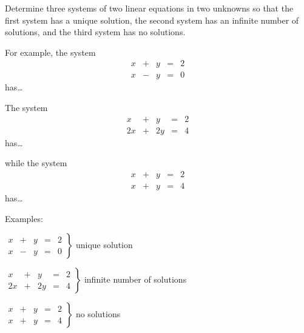 \documentclass{ximera}
\begin{document}
\begin{exercise} \label{c2.2.6}
Determine three systems of two linear equations in two unknowns
so that the first system has a unique solution, the second
system has an infinite number of solutions, and the third system
has no solutions.

\begin{prompt}
  For example, the system
  \[\begin{array}{rrrrr}
x & + & y & = & 2 \\
x & - & y & = & 0\end{array}\]
has\ldots
\begin{multipleChoice}
\end{multipleChoice}

The system
\[\begin{array}{rrrrr}
x & + & y & = & 2 \\
    2x & + & 2y & = & 4\end{array}\]
has\ldots
\begin{multipleChoice}
\end{multipleChoice}
while the system
\[\begin{array}{rrrrr}
x & + & y & = & 2 \\
    x & + & y & = & 4\end{array}\]
has\ldots
\begin{multipleChoice}
\end{multipleChoice}
\end{prompt}

\begin{solution}

Examples:

$\left. \begin{array}{rrrrr}
x & + & y & = & 2 \\
x & - & y & = & 0\end{array} \right\}$
unique solution

$\left. \begin{array}{rrrrr}
x & + & y & = & 2 \\
2x & + & 2y & = & 4\end{array} \right\}$
infinite number of solutions

$\left. \begin{array}{rrrrr}
x & + & y & = & 2 \\
x & + & y & = & 4\end{array} \right\}$
no solutions

\end{solution}
\end{exercise}
\end{document}
